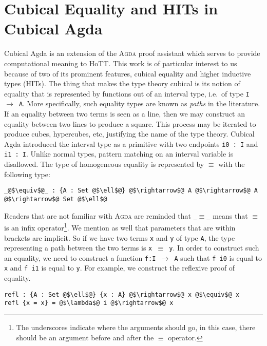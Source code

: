 \documentclass[12pt,twoside,maitrise]{dms}
\theoremstyle{definition}
\numberwithin{equation}{section}
\numberwithin{table}{chapter}
\numberwithin{figure}{chapter}
\newcommand\id[1] {\texttt{#1}}
\newcommand\fn[1] {\texttt{#1}}
\def\Agda{\textsc{Agda}\xspace}
\begin{document}
\section{Cubical Equality and HITs in Cubical Agda}\label{sec:cubical-agda}

Cubical Agda\cite{vezzosi2021cubical} is an extension of the \Agda{} proof
assistant which serves to provide computational meaning to HoTT. This work is
of particular interest to us because of two of its prominent features, cubical
equality and higher inductive types (HITs). The thing that makes the type theory
cubical is its notion of equality that is represented by functions out of an
interval type, i.e.\ of type \fn{I $\rightarrow$ A}. More specifically, such
equality types are known as \emph{paths} in the literature. If an equality
between two terms is seen as a line, then we may construct an equality between
two lines to produce a square. This process may be iterated to produce cubes,
hypercubes, etc, justifying the name of the type theory. Cubical Agda introduced
the interval type as a primitive with two endpoints \fn{i0 : I} and \fn{i1 : I}.
Unlike normal types, pattern matching on an interval variable is disallowed. The
type of homogeneous equality is represented by $\equiv$ with the following type:

\begin{verbatim}
_@$\equiv$@_ : {A : Set @$\ell$@} @$\rightarrow$@ A @$\rightarrow$@ A @$\rightarrow$@ Set @$\ell$@
\end{verbatim}

Readers that are not familiar with \Agda{} are reminded that \fn{\_$\equiv$\_}
means that $\equiv$ is an infix operator\footnote{The underscores indicate where
the arguments should go, in this case, there should be an argument before and
after the $\equiv$ operator.}. We mention as well that parameters that are
within brackets are implicit. So if we have two terms \id{x} and \id{y} of type
\id{A}, the type representing a path between the two terms is \fn{x $\equiv$ y}.
In order to construct such an equality, we need to construct a function \id{f:I
  $\rightarrow$ A} such that \fn{f i0} is equal to \id{x} and \fn{f i1} is equal
to \id{y}. For example, we construct the reflexive proof of equality.

\begin{verbatim}
refl : {A : Set @$\ell$@} {x : A} @$\rightarrow$@ x @$\equiv$@ x
refl {x = x} = @$\lambda$@ i @$\rightarrow$@ x
\end{verbatim}
\end{document}
